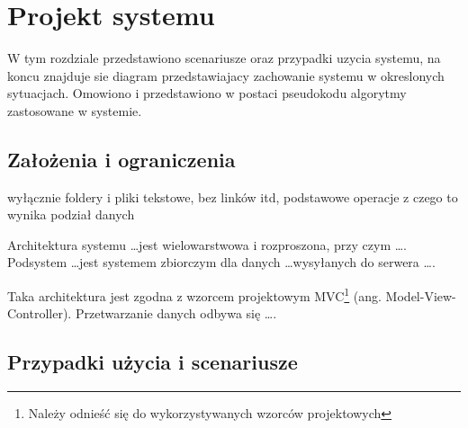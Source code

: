 \chapter{Projekt systemu}
\thispagestyle{chapterBeginStyle}
W tym rozdziale przedstawiono scenariusze oraz przypadki uzycia systemu, na koncu znajduje sie diagram przedstawiajacy zachowanie systemu w okreslonych sytuacjach. Omowiono i przedstawiono w postaci pseudokodu algorytmy zastosowane w systemie. 

\section{Założenia i ograniczenia}
wyłącznie foldery i pliki tekstowe, bez linków itd, podstawowe operacje z czego to wynika podział danych

{\color{dgray}
Architektura systemu \ldots jest wielowarstwowa i rozproszona, przy czym \ldots. Podsystem  \ldots jest systemem zbiorczym dla danych \ldots wysyłanych do serwera \ldots. 

Taka architektura jest zgodna z wzorcem projektowym MVC\footnote{Należy odnieść się do wykorzystywanych wzorców projektowych} (ang.  Model-View-Controller). Przetwarzanie danych odbywa się \ldots.
} 

\section{Przypadki użycia i scenariusze}
